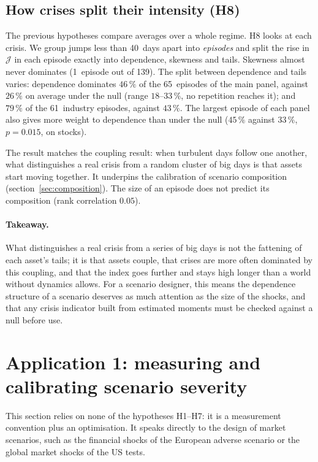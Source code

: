 \documentclass[11pt]{article}
\theoremstyle{definition}
\newcommand{\JJ}{\mathcal{J}}
\begin{document}
\subsection{How crises split their intensity (H8)}
\label{sec:h8}

The previous hypotheses compare averages over a whole regime. H8 looks at each
crisis. We group jumps less than 40~days apart into \emph{episodes} and split
the rise in $\JJ$ in each episode exactly into dependence, skewness and tails.
Skewness almost never dominates (1~episode out of 139). The split between
dependence and tails varies: dependence dominates $46\,\%$ of the 65~episodes
of the main panel, against $26\,\%$ on average under the null (range
$18$--$33\,\%$, no repetition reaches it); and $79\,\%$ of the 61~industry
episodes, against $43\,\%$. The largest episode of each panel also gives more
weight to dependence than under the null ($45\,\%$ against $33\,\%$,
$p=0.015$, on stocks).

The result matches the coupling result: when turbulent days follow one
another, what distinguishes a real crisis from a random cluster of big days is
that assets start moving together. It underpins the calibration of scenario
composition (section~\ref{sec:composition}). The size of an episode does not
predict its composition (rank correlation $0.05$).

\paragraph{Takeaway.} What distinguishes a real crisis from a series of big
days is not the fattening of each asset's tails; it is that assets couple,
that crises are more often dominated by this coupling, and that the index goes
further and stays high longer than a world without dynamics allows. For a
scenario designer, this means the dependence structure of a scenario deserves
as much attention as the size of the shocks, and that any crisis indicator
built from estimated moments must be checked against a null before use.

\section{Application 1: measuring and calibrating scenario severity}
\label{sec:stress}

This section relies on none of the hypotheses H1--H7: it is a measurement
convention plus an optimisation. It speaks directly to the design of market
scenarios, such as the financial shocks of the European adverse scenario or
the global market shocks of the US tests.
\end{document}
